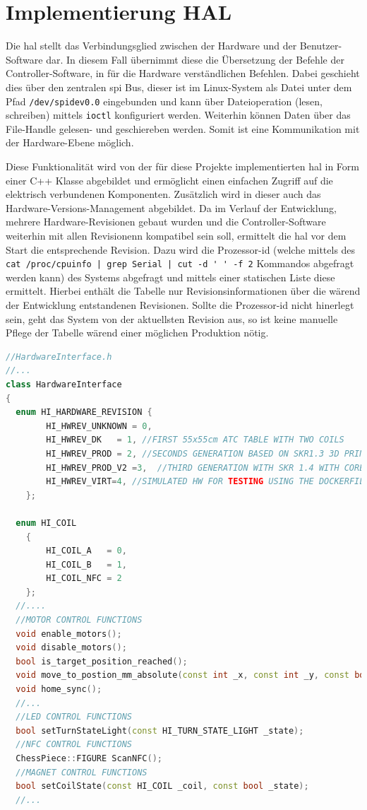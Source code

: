 \hypertarget{implementierung-hal}{%
\section{Implementierung HAL}\label{implementierung-hal}}

Die \gls{hal} stellt das Verbindungsglied zwischen der Hardware und der
Benutzer-Software dar. In diesem Fall übernimmt diese die Übersetzung
der Befehle der Controller-Software, in für die Hardware verständlichen
Befehlen. Dabei geschieht dies über den zentralen \gls{spi} Bus, dieser
ist im Linux-System als Datei unter dem Pfad
\passthrough{\lstinline!/dev/spidev0.0!} eingebunden und kann über
Dateioperation (lesen, schreiben) mittels
\passthrough{\lstinline!ioctl!} konfiguriert werden. Weiterhin können
Daten über das File-Handle gelesen- und geschiereben werden. Somit ist
eine Kommunikation mit der Hardware-Ebene möglich.

Diese Funktionalität wird von der für diese Projekte implementierten
\gls{hal} in Form einer C++ Klasse abgebildet und ermöglicht einen
einfachen Zugriff auf die elektrisch verbundenen Komponenten. Zusätzlich
wird in dieser auch das Hardware-Versions-Management abgebildet. Da im
Verlauf der Entwicklung, mehrere Hardware-Revisionen gebaut wurden und
die Controller-Software weiterhin mit allen Revisionenn kompatibel sein
soll, ermittelt die \gls{hal} vor dem Start die entsprechende Revision.
Dazu wird die Prozessor-\gls{id} (welche mittels des
\passthrough{\lstinline!cat /proc/cpuinfo | grep Serial | cut -d ' ' -f 2!}
Kommandos abgefragt werden kann) des Systems abgefragt und mittels einer
statischen Liste diese ermittelt. Hierbei enthält die Tabelle nur
Revisionsinformationen über die wärend der Entwicklung entstandenen
Revisionen. Sollte die Prozessor-\gls{id} nicht hinerlegt sein, geht das
System von der aktuellsten Revision aus, so ist keine manuelle Pflege
der Tabelle wärend einer möglichen Produktion nötig.

\begin{lstlisting}[language={C++}]
//HardwareInterface.h
//...
class HardwareInterface
{
  enum HI_HARDWARE_REVISION {
        HI_HWREV_UNKNOWN = 0,
        HI_HWREV_DK   = 1, //FIRST 55x55cm ATC TABLE WITH TWO COILS
        HI_HWREV_PROD = 2, //SECONDS GENERATION BASED ON SKR1.3 3D PRINT CONTROLLER
        HI_HWREV_PROD_V2 =3,  //THIRD GENERATION WITH SKR 1.4 WITH CORE XY MECHANIC
        HI_HWREV_VIRT=4, //SIMULATED HW FOR TESTING USING THE DOCKERFILE
    };

  enum HI_COIL
    {
        HI_COIL_A   = 0,
        HI_COIL_B   = 1,
        HI_COIL_NFC = 2
    };
  //....
  //MOTOR CONTROL FUNCTIONS
  void enable_motors();
  void disable_motors();
  bool is_target_position_reached();
  void move_to_postion_mm_absolute(const int _x, const int _y, const bool _blocking);
  void home_sync();
  //...
  //LED CONTROL FUNCTIONS
  bool setTurnStateLight(const HI_TURN_STATE_LIGHT _state);
  //NFC CONTROL FUNCTIONS
  ChessPiece::FIGURE ScanNFC();
  //MAGNET CONTROL FUNCTIONS
  bool setCoilState(const HI_COIL _coil, const bool _state);
  //...
\end{lstlisting}


